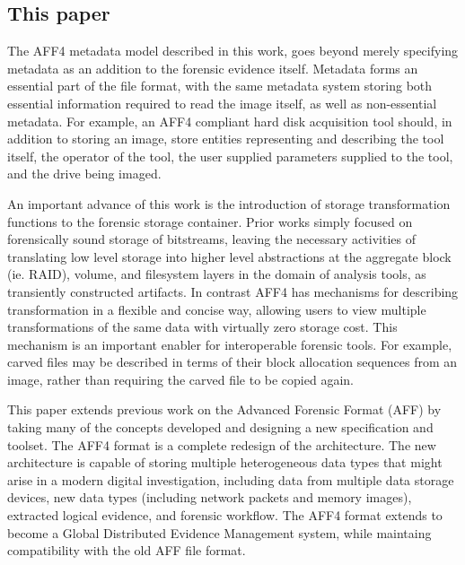 \documentclass[10pt, conference]{IEEEtran}
\begin{document}

\subsection{This paper}
The AFF4 metadata model described in this work, goes beyond merely
specifying metadata as an addition to the forensic evidence
itself. Metadata forms an essential part of the file format, with the
same metadata system storing both essential information required to
read the image itself, as well as non-essential metadata. For example,
an AFF4 compliant hard disk acquisition tool should, in addition to
storing an image, store entities representing and describing the tool
itself, the operator of the tool, the user supplied parameters
supplied to the tool, and the drive being imaged.

An important advance of this work is the introduction of storage
transformation functions to the forensic storage container. Prior
works simply focused on forensically sound storage of bitstreams,
leaving the necessary activities of translating low level storage into
higher level abstractions at the aggregate block (ie. RAID), volume,
and filesystem layers in the domain of analysis tools, as transiently
constructed artifacts. In contrast AFF4 has mechanisms for describing
transformation in a flexible and concise way, allowing users to view
multiple transformations of the same data with virtually zero storage
cost. This mechanism is an important enabler for interoperable
forensic tools. For example, carved files may be described in terms of
their block allocation sequences from an image, rather than requiring
the carved file to be copied again.

This paper extends previous work on the Advanced Forensic Format (AFF)
by taking many of the concepts developed and designing a new
specification and toolset. The AFF4 format is a complete redesign of
the architecture. The new architecture is capable of storing multiple
heterogeneous data types that might arise in a modern digital
investigation, including data from multiple data storage devices, new
data types (including network packets and memory images), extracted
logical evidence, and forensic workflow. The AFF4 format extends to
become a Global Distributed Evidence Management system, while
maintaing compatibility with the old AFF file format.
\end{document}
